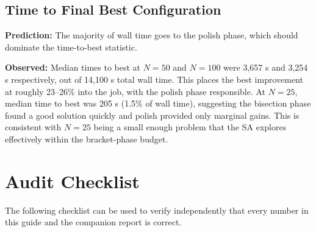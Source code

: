 \documentclass[11pt,oneside]{article}
\begin{document}
\subsection{Time to Final Best Configuration}

\textbf{Prediction:} The majority of wall time goes to the polish phase,
which should dominate the time-to-best statistic.

\textbf{Observed:} Median times to best at $N = 50$ and $N = 100$ were
3{,}657 s and 3{,}254 s respectively, out of 14{,}100 s total wall time.
This places the best improvement at roughly 23--26\% into the job,
with the polish phase responsible. At $N = 25$, median time to best was
205 s (1.5\% of wall time), suggesting the bisection phase found a good
solution quickly and polish provided only marginal gains. This is
consistent with $N = 25$ being a small enough problem that the SA
explores effectively within the bracket-phase budget.

\section{Audit Checklist}
\label{sec:checklist}

The following checklist can be used to verify independently that every
number in this guide and the companion report is correct.
\end{document}

